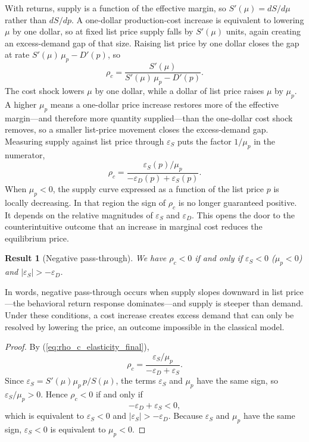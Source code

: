 \documentclass[11pt]{article}
\newtheorem{result}{Result}
\begin{document}
With returns, supply is a function of the effective margin, so
$S'(\mu)=dS/d\mu$ rather than $dS/dp$.  A one-dollar production-cost increase
is equivalent to lowering $\mu$ by one dollar, so at fixed list price supply
falls by $S'(\mu)$ units, again creating an excess-demand gap of that size.
Raising list price by one dollar closes the gap at rate
$S'(\mu)\,\mu_p-D'(p)$, so
\[
\rho_c=\frac{S'(\mu)}{S'(\mu)\,\mu_p-D'(p)}.
\]
The cost shock lowers $\mu$ by one dollar, while a dollar of list price raises
$\mu$ by $\mu_p$.  A higher $\mu_p$ means a one-dollar price increase restores
more of the effective margin---and therefore more quantity supplied---than the
one-dollar cost shock removes, so a smaller list-price movement closes the
excess-demand gap.  Measuring supply against list price through
$\varepsilon_S$ puts the factor $1/\mu_p$ in the numerator,
\begin{equation}
  \rho_c
  =
  \frac{\varepsilon_S(p)/\mu_p}
       {-\varepsilon_D(p)+\varepsilon_S(p)}.
  \label{eq:rho_c_elasticity_final}
\end{equation}
When $\mu_p<0$, the supply curve expressed as a function of the list price
$p$ is locally decreasing.  In that region the sign of $\rho_c$ is no longer
guaranteed positive.  It depends on the relative magnitudes of $\varepsilon_S$
and $\varepsilon_D$.  This opens the door to the counterintuitive outcome that
an increase in marginal cost reduces the equilibrium price.
\begin{result}[Negative pass-through]
\label{res:negative-pt}
  We have $\rho_c<0$ if and only if $\varepsilon_S<0$ ($\mu_p<0$) and
  $|\varepsilon_S|>-\varepsilon_D$.
\end{result}
In words, negative pass-through occurs when supply slopes downward in list
price---the behavioral return response dominates---and supply is steeper than
demand.  Under these conditions, a cost increase creates excess demand that
can only be resolved by lowering the price, an outcome impossible in the
classical model.
\begin{proof}
By (\ref{eq:rho_c_elasticity_final}),
\[
  \rho_c = \frac{\varepsilon_S/\mu_p}{-\varepsilon_D+\varepsilon_S}.
\]
Since
$\varepsilon_S=S'(\mu)\mu_p\,p/S(\mu)$, the terms $\varepsilon_S$ and $\mu_p$
have the same sign, so $\varepsilon_S/\mu_p>0$.  Hence $\rho_c<0$ if and only
if
\[
  -\varepsilon_D+\varepsilon_S<0,
\]
which is equivalent to $\varepsilon_S<0$ and
$|\varepsilon_S|>-\varepsilon_D$.  Because $\varepsilon_S$ and $\mu_p$ have the
same sign, $\varepsilon_S<0$ is equivalent to $\mu_p<0$.
\end{proof}
\end{document}
